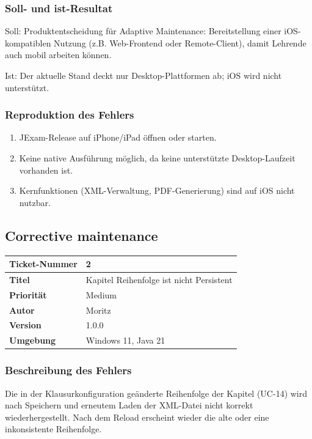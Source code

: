 \documentclass[a4paper]{article}
\begin{document}
\subsubsection*{Soll- und ist-Resultat}
Soll: Produktentscheidung für Adaptive Maintenance: Bereitstellung einer iOS-kompatiblen Nutzung (z.B. Web-Frontend oder Remote-Client), damit Lehrende auch mobil arbeiten können. 

Ist: Der aktuelle Stand deckt nur Desktop-Plattformen ab; iOS wird nicht unterstützt.

\subsubsection*{Reproduktion des Fehlers} 

\begin{enumerate}
    \item JExam-Release auf iPhone/iPad öffnen oder starten.
    \item Keine native Ausführung möglich, da keine unterstützte Desktop-Laufzeit vorhanden ist.
    \item Kernfunktionen (XML-Verwaltung, PDF-Generierung) sind auf iOS nicht nutzbar.
\end{enumerate}

\newpage
\subsection{Corrective maintenance}

\begin{center}
\begin{tabular}{|p{3cm}|p{8cm}|}
\hline
\textbf{Ticket-Nummer} & 2 \\
\hline
\textbf{Titel} & Kapitel Reihenfolge ist nicht Persistent \\
\hline
\textbf{Priorität} & Medium \\
\hline
\textbf{Autor} & Moritz \\
\hline
\textbf{Version} & 1.0.0 \\
\hline
\textbf{Umgebung} & Windows 11, Java 21 \\
\hline
\end{tabular}
\end{center}

\subsubsection*{Beschreibung des Fehlers}
Die in der Klausurkonfiguration geänderte Reihenfolge der Kapitel (UC-14) wird nach Speichern und erneutem Laden der XML-Datei nicht korrekt wiederhergestellt. Nach dem Reload erscheint wieder die alte oder eine inkonsistente Reihenfolge.
\end{document}
